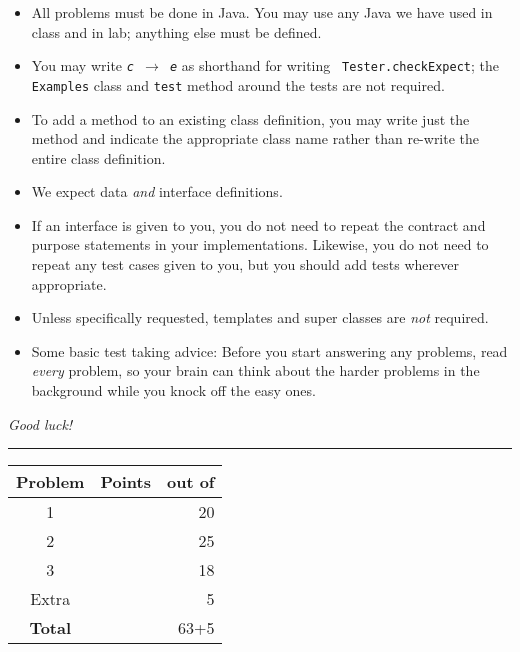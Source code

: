 \documentclass[12pt]{article}                   %
\begin{document}
\noindent\begin{minipage}{8cm}\sloppy
\begin{itemize}

\item All problems must be done in Java. You may use any Java we have
  used in class and in lab; anything else must be defined.

\item You may write {\tt {\slshape c} $\rightarrow$ {\slshape e}} as
  shorthand for writing {\tt
    Tester.checkExpect}; the {\tt Examples} class and {\tt test}
  method around the tests are not required.

\item To add a method to an existing class definition, you
  may write just the method and indicate the appropriate class name
  rather than re-write the entire class definition.

\item We expect data \emph{and} interface definitions.

\item If an interface is given to you, you do not need to repeat the
  contract and purpose statements in your implementations.  Likewise,
  you do not need to repeat any test cases given to you, but you
  should add tests wherever appropriate.



\item Unless specifically requested, templates and super classes are
  \emph{not} required.

\item Some basic test taking advice: Before you start answering
any problems, read \emph{every} problem, so your brain can  think
about the harder problems in the background while you knock off the easy ones.
\end{itemize}
\bigskip

\emph{Good luck!}
\end{minipage}\hfil\begin{minipage}[t]{6cm}
\rule{1cm}{0pt}\begin{tabular}{|c|l|@{/}r|}
\hline
{\bf Problem} & Points & out of \\ \hline
1 & & 20\\ \hline
2 & & 25\\ \hline
3 & & 18\\ \hline
Extra & & 5 \\ \hline
{\bf Total} & & 63+5 \\ \hline
\end{tabular}
\end{minipage}
\end{document}
